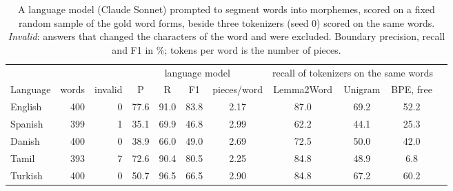 \begin{table}[!ht]
\centering
\caption{A language model (Claude Sonnet) prompted to segment words into morphemes, scored on a fixed random sample of the gold word forms, beside three tokenizers (seed 0) scored on the same words. \emph{Invalid}: answers that changed the characters of the word and were excluded. Boundary precision, recall and F1 in \%; tokens per word is the number of pieces.}
\label{tab:llm}
\small
\setlength{\tabcolsep}{3.5pt}
\begin{tabular}{lrrcccccccc}
\toprule
 & & & \multicolumn{4}{c}{language model} & \multicolumn{3}{c}{recall of tokenizers on the same words} \\
\cmidrule(lr){4-7}\cmidrule(lr){8-10}
Language & words & invalid & P & R & F1 & pieces/word & Lemma2Word & Unigram & BPE, free \\
\midrule
English & 400 & 0 & 77.6 & 91.0 & 83.8 & 2.17 & 87.0 & 69.2 & 52.2 \\
Spanish & 399 & 1 & 35.1 & 69.9 & 46.8 & 2.99 & 62.2 & 44.1 & 25.3 \\
Danish & 400 & 0 & 38.9 & 66.0 & 49.0 & 2.69 & 72.5 & 50.0 & 42.0 \\
Tamil & 393 & 7 & 72.6 & 90.4 & 80.5 & 2.25 & 84.8 & 48.9 & 6.8 \\
Turkish & 400 & 0 & 50.7 & 96.5 & 66.5 & 2.90 & 84.8 & 67.2 & 60.2 \\
\bottomrule
\end{tabular}
\end{table}
